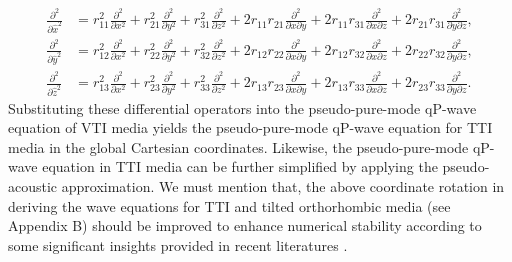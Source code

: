 \begin{equation}
\label{eq:difoper}
\begin{split}
\frac{\partial^2}{\partial{\widehat{x}^2}} &= {r_{11}^2}\frac{\partial^2}{\partial x^2}
                                           + {r_{21}^2}\frac{\partial^2}{\partial y^2}
                                           + {r_{31}^2}\frac{\partial^2}{\partial z^2}
                                           + 2r_{11}r_{21}\frac{\partial^2}{{\partial x}{\partial y}}
                                           + 2r_{11}r_{31}\frac{\partial^2}{{\partial x}{\partial z}}
                                           + 2r_{21}r_{31}\frac{\partial^2}{{\partial y}{\partial z}}, \\
\frac{\partial^2}{\partial{\widehat{y}^2}} &= {r_{12}^2}\frac{\partial^2}{\partial x^2}
                                           + {r_{22}^2}\frac{\partial^2}{\partial y^2}
                                           + {r_{32}^2}\frac{\partial^2}{\partial z^2}
                                           + 2r_{12}r_{22}\frac{\partial^2}{{\partial x}{\partial y}}
                                           + 2r_{12}r_{32}\frac{\partial^2}{{\partial x}{\partial z}}
                                           + 2r_{22}r_{32}\frac{\partial^2}{{\partial y}{\partial z}}, \\
\frac{\partial^2}{\partial{\widehat{z}^2}} &= {r_{13}^2}\frac{\partial^2}{\partial x^2}
                                           + {r_{23}^2}\frac{\partial^2}{\partial y^2}
                                           + {r_{33}^2}\frac{\partial^2}{\partial z^2}
                                           + 2r_{13}r_{23}\frac{\partial^2}{{\partial x}{\partial y}}
                                           + 2r_{13}r_{33}\frac{\partial^2}{{\partial x}{\partial z}}
                                           + 2r_{23}r_{33}\frac{\partial^2}{{\partial y}{\partial z}}.
\end{split}
\end{equation}
Substituting these differential operators into the pseudo-pure-mode qP-wave equation of VTI media 
 yields the pseudo-pure-mode qP-wave equation for TTI media in the global Cartesian coordinates.
Likewise, the pseudo-pure-mode qP-wave equation in TTI media can be further simplified by applying the pseudo-acoustic approximation.
We must mention that, the above
coordinate rotation in deriving the wave equations for TTI and tilted orthorhombic media (see Appendix B)
 should be improved to enhance numerical stability according to some significant insights provided in recent literatures  
 \cite[]{duveneck:2011,macesanu,zhang:2011,bube:2012}.

